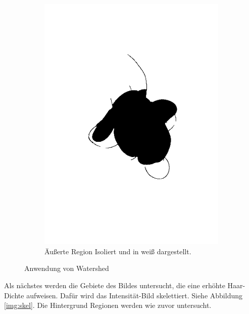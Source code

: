 \documentclass[german,a4paper, 12pt]{llncs}
\begin{document}
\begin{figure}
\begin{subfigure}[b]{0.475\textwidth}
		\includegraphics[width=\textwidth]{fig64/08outer section.png}
		\caption[]{Äußerte Region Isoliert und in weiß dargestellt.}
		\label{img:outerSection}
	\end{subfigure}
	\caption[  ]
	{\small Anwendung von Watershed} 
	\label{img:regionwrap}
\end{figure}

Als nächstes werden die Gebiete des Bildes untersucht, die eine erhöhte Haar-Dichte aufweisen.
Dafür wird das Intensität-Bild skelettiert. Siehe Abbildung \ref{img:skel}.
Die Hintergrund Regionen werden wie zuvor untersucht.
\end{document}

